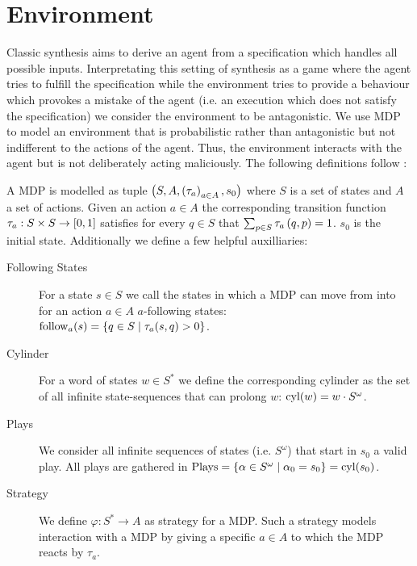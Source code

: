 \chapter{Environment}
Classic synthesis aims to derive an agent from a specification which handles
all possible inputs. Interpretating this setting of synthesis as a game where
the agent tries to fulfill the specification while the environment tries to
provide a behaviour which provokes a mistake of the agent (i.e. an execution
which does not satisfy the specification) we consider the environment to be
antagonistic. We use \ac{MDP} to model an environment that is probabilistic
rather than antagonistic but not indifferent to the actions of the agent. Thus,
the environment interacts with the agent but is not deliberately acting
maliciously. The following definitions follow \cite{RandAutoInfTrees}:

\begin{definition}
  A \acl*{MDP} is modelled as tuple
  $\left(S, A, \left(\tau_{a}\right)_{a\in A}, s_{0}\right)$ where $S$ is a set of states
  and $A$ a set of actions. Given an action $a\in A$ the corresponding
  transition function $\tau_{a}:S\times S\rightarrow \left[0,1\right]$ satisfies
  for every $q\in S$ that $\sum_{p\in S}\tau_{a}\left(q,p\right) = 1$.
  $s_{0}$ is the initial state. Additionally we define a few helpful
  auxilliaries:
  \begin{description}
    \item [Following States] For a state $s\in S$ we call the states in which a
      \ac{MDP} can move from into for an action $a\in A$ $a$-following states:\\
      $\operatorname{follow}_{a}(s) = \left\{q\in S\mid \tau_{a}(s,q) > 0\right\}$.
    \item [Cylinder] For a word of states $w\in S^{*}$ we define the
      corresponding cylinder as the set of all infinite state-sequences
      that can prolong $w$: $\operatorname{cyl}(w) = w\cdot S^{\omega}$.
    \item [Plays] We consider all infinite sequences of states
      (i.e. $S^{\omega}$) that start in $s_{0}$ a valid play. All plays
      are gathered in $\operatorname{Plays} = \left\{
        \alpha\in S^{\omega}\mid \alpha_{0} = s_{0}\right\} = \operatorname{cyl}(s_{0})$.
    \item [Strategy] We define $\varphi:S^{*}\rightarrow A$ as strategy for
      a \ac{MDP}. Such a strategy models interaction with a \ac{MDP} by
      giving a specific $a\in A$ to which the \ac{MDP} reacts by $\tau_{a}$.
  \end{description}
\end{definition}

